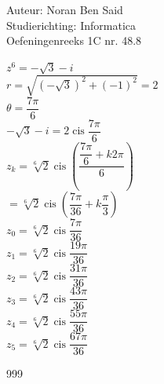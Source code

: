 \documentclass[a4paper]{article}
\begin{document}
\noindent \large Auteur: Noran Ben Said \\
\noindent \large Studierichting: Informatica\\
\noindent \large Oefeningenreeks 1C nr. 48.8\\

\medskip
\normalsize

$z^6 = -\sqrt{3} - i$\\

$r = \sqrt{(-\sqrt{3})^2 + (-1)^2} = 2$\\

$\theta = \dfrac{7\pi}{6}$\\

$-\sqrt{3} - i = 2 \operatorname{cis} \dfrac{7\pi}{6}$\\

$z_k = \sqrt[6]{2} \operatorname{cis} \left( \dfrac{\dfrac{7\pi}{6} + k2\pi}{6} \right)$\\

$= \sqrt[6]{2} \operatorname{cis} \left( \dfrac{7\pi}{36} + k\dfrac{\pi}{3} \right)$\\

$z_0 = \sqrt[6]{2} \operatorname{cis} \dfrac{7\pi}{36}$\\

$z_1 = \sqrt[6]{2} \operatorname{cis} \dfrac{19\pi}{36}$\\

$z_2 = \sqrt[6]{2} \operatorname{cis} \dfrac{31\pi}{36}$\\

$z_3 = \sqrt[6]{2} \operatorname{cis} \dfrac{43\pi}{36}$\\

$z_4 = \sqrt[6]{2} \operatorname{cis} \dfrac{55\pi}{36}$\\

$z_5 = \sqrt[6]{2} \operatorname{cis} \dfrac{67\pi}{36}$\\


\begin{thebibliography}{999}
\end{thebibliography}
\end{document}
